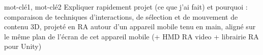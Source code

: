 \begin{sommaire}{mot-clé1, mot-clé2}
    Expliquer rapidement projet (ce que j'ai fait) et pourquoi : comparaison de techniques d'interactions, de sélection et de mouvement de contenu 3D, projeté en RA autour d'un appareil mobile tenu en main, aligné sur le même plan de l'écran de cet appareil mobile (+ HMD RA video + librairie RA pour Unity)
\end{sommaire}

\begin{abstract}{Titre en anglais}{keyword1, keyword2}
\end{abstract}